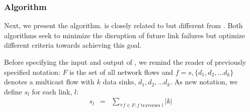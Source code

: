 



\subsubsection{\md Algorithm}
\label{subsubsec:md-alg}

Next, we present the \md algorithm. \md is closely related to but different from \mfs.  Both algorithms seek to minimize the disruption of future link failures but optimize different
criteria towards achieving this goal.  

Before specifying the input and output of \mds, we remind the reader of previously specified notation: $F$ is the set of all network flows and 
$f = s,\{d_1,d_2, ... d_k\}$ denotes a multicast flow with $k$ data sinks, $d_1,d_2, ... d_k$.  As new notation, we define $s_l$ for each link, $l$: %
\begin{eqnarray}
s_l &=& \sum_{\forall f \in F : f \text{ traverses } l} |k|
\end{eqnarray}

